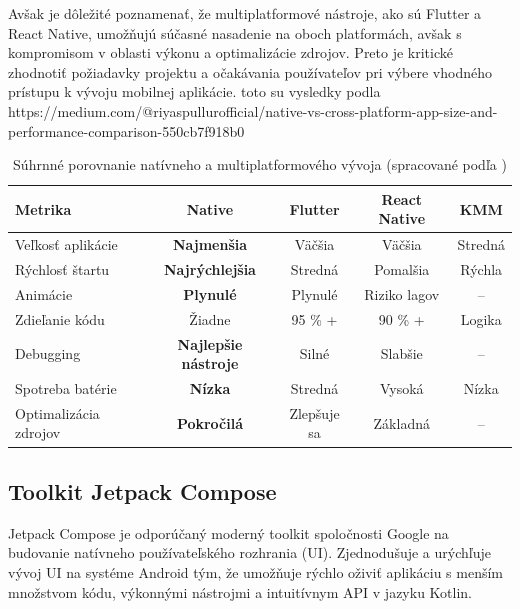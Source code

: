 Avšak je dôležité poznamenať, že multiplatformové nástroje, ako sú Flutter a React Native, umožňujú súčasné nasadenie na oboch platformách, avšak s kompromisom v oblasti výkonu a optimalizácie zdrojov. Preto je kritické zhodnotiť požiadavky projektu a očakávania používateľov pri výbere vhodného prístupu k vývoju mobilnej aplikácie.
toto su vysledky podla  https://medium.com/@riyaspullurofficial/native-vs-cross-platform-app-size-and-performance-comparison-550cb7f918b0
\begin{table}[h!]
\centering
\caption{Súhrnné porovnanie natívneho a multiplatformového vývoja (spracované podľa \cite{pullur_medium_2025})}
\label{tab:final_comparison}
\begin{tabular}{|l|c|c|c|c|}
\hline
\textbf{Metrika} & \textbf{Native} & \textbf{Flutter} & \textbf{React Native} & \textbf{KMM} \\ \hline
Veľkosť aplikácie & \textbf{Najmenšia} & Väčšia & Väčšia & Stredná \\ \hline
Rýchlosť štartu & \textbf{Najrýchlejšia} & Stredná & Pomalšia & Rýchla \\ \hline
Animácie & \textbf{Plynulé} & Plynulé & Riziko lagov & -- \\ \hline
Zdieľanie kódu & Žiadne & 95 \% + & 90 \% + & Logika \\ \hline
Debugging & \textbf{Najlepšie nástroje} & Silné & Slabšie & -- \\ \hline
Spotreba batérie & \textbf{Nízka} & Stredná & Vysoká & Nízka \\ \hline
Optimalizácia zdrojov & \textbf{Pokročilá} & Zlepšuje sa & Základná & -- \\ \hline
\end{tabular}
\end{table}

\subsection{Toolkit Jetpack Compose}
Jetpack Compose je odporúčaný moderný toolkit spoločnosti Google na budovanie natívneho používateľského rozhrania (UI). 
Zjednodušuje a urýchľuje vývoj UI na systéme Android tým, že umožňuje rýchlo oživiť aplikáciu s menším množstvom kódu, 
výkonnými nástrojmi a intuitívnym API v jazyku Kotlin.

